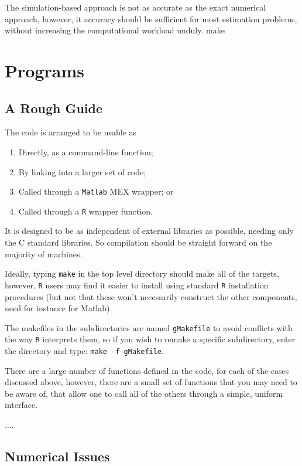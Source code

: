 \documentclass{article}
\begin{document}
The simulation-based approach is not as accurate as the exact
numerical approach, however, it accuracy should be sufficient for most
estimation problems, without increasing the computational workload
unduly.
make


\section{Programs}
\label{sec:program}

\subsection{A Rough Guide}

The code is arranged to be usable as
\begin{enumerate}

\item Directly, as a command-line function;

\item By linking into a larger set of code;

\item Called through a {\tt Matlab} MEX wrapper; or 

\item Called through a {\tt R} wrapper function.

\end{enumerate}
It is designed to be as independent of external libraries as possible,
needing only the C standard libraries. So compilation should be
straight forward on the majority of machines.

Ideally, typing {\tt make} in the top level directory should make all
of the targets, however, {\tt R} users may find it easier to install
using standard {\tt R} installation procedures (but not that these
won't necessarily construct the other components, need for instance
for Matlab).

The makefiles in the subdirectories are named {\tt gMakefile} to avoid
conflicts with the way {\tt R} interprets them, so if you wish to
remake a specific subdirectory, enter the directory and type: 
\verb|make -f gMakefile|.

There are a large number of functions defined in the code, for each of
the cases discussed above, however, there are a small set of functions
that you may need to be aware of, that allow one to call all of the
others through a simple, uniform interface.

....


\subsection{Numerical Issues}
\end{document}
